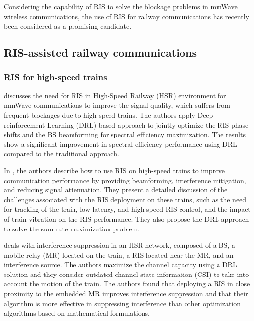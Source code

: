 \documentclass[conference]{IEEEtran}
\begin{document}
Considering the capability of RIS to solve the blockage problems in mmWave wireless communications, the use of RIS for railway communications has recently been considered as a promising candidate.

\subsection{RIS-assisted railway communications}
\subsubsection{RIS for high-speed trains}
\cite{Xu2022-2} discusses the need for RIS in High-Speed Railway (HSR) environment for mmWave communications to improve the signal quality, which suffers from frequent blockages due to high-speed trains. The authors apply Deep reinforcement Learning (DRL) based approach to jointly optimize the RIS phase shifts and the BS beamforming for spectral efficiency maximization. The results show a significant improvement in spectral efficiency performance using DRL compared to the traditional approach. %

In \cite{9690475}, the authors describe how to use RIS on high-speed trains to improve communication performance by providing beamforming, interference mitigation, and reducing signal attenuation. They present a detailed discussion of the challenges associated with the RIS deployment on these trains, such as the need for tracking of the train, low latency, and high-speed RIS control, and the impact of train vibration on the RIS performance. They also propose the DRL approach to solve the sum rate maximization problem.

\cite{9814619} deals with interference suppression in an HSR network,  composed of a BS, a mobile relay (MR) located on the train, a RIS located near the MR, and an interference
source. The authors maximize the channel capacity %
using a DRL solution and they consider outdated channel state information (CSI) to take into account the motion of the train. The authors found that deploying a RIS in close proximity to the embedded  MR improves interference suppression and that their algorithm is more effective in suppressing interference than other optimization algorithms
based on mathematical formulations.
\end{document}
